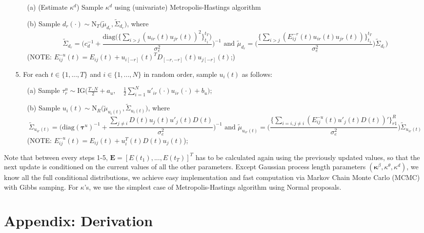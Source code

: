 \documentclass[a4paper]{article}
\begin{document}
\begin{itemize}
		\begin{enumerate}
			\item [(a)] (Estimate $\kappa^d$) Sample $\kappa^d$ using (univariate) Metropolis-Hastings algorithm 
				\item [(b)] Sample $d_r(\cdot) \sim \mbox{N}_T\big(\tilde{\mu}_{d_r}, \tilde{\Sigma}_{d_r} \big)$, where
$$\tilde{\Sigma}_{d_r} = \Big(c_d^{-1}+\frac{\mbox{diag}\big(\{\sum_{i>j}({u_{ir}(t)u_{jr}(t)})^2\}_{t_1}^{t_T}\big)}{\sigma_e^2}\Big)^{-1} \mbox{ and } \tilde{\mu}_{d_r} =  \Big(\frac{\{\sum_{i>j}(E^{-r}_{ij}(t)u_{ir}(t)u_{jr}(t))\}_{t_1}^{t_T}}{\sigma_e^2}\Big)\tilde{\Sigma}_{d_r})$$
(NOTE: $E^{-u}_{ij}(t)=E_{ij}(t)+u_{i[-r]}(t)^TD_{[-r, -r]}(t)u_{j[-r]}(t)$;)		
		\end{enumerate}		
		\item [5.] For each $t \in \{1,...,T\}$ and $i \in \{1,...,N\}$ in random order, sample $u_{i}(t)$ as follows:
		\begin{enumerate}
			\item [(a)] Sample $\tau_r^{u} \sim \mbox{IG}\big(\frac{T\cdot N}{2}+a_u,\quad \frac{1}{2}\sum\limits_{i = 1}^N u'_{ir}(\cdot)u_{ir}(\cdot)+b_u\big)$; 
			\item [(b)] Sample $u_{i}(t)\sim \mbox{N}_R\big(\tilde{\mu}_{u_{i}(t)}, \tilde{\Sigma}_{u_{i}(t)} \big)$, where
			$$\tilde{\Sigma}_{u_{ir}(t)} = \Big(\mbox{diag}(\boldsymbol{\tau}^u)^{-1}+\frac{\sum\limits_{j\neq i}D(t)u_{j}(t)u'_j(t)D(t)}{\sigma_e^2}\Big)^{-1}\mbox{ and } \tilde{\mu}_{u_{ir}(t)} = \Big(\frac{\{\sum_{i=i, j\neq i}(E^{-u}_{ij}(t)u'_{j}(t)D(t))'\}_{r1}^R}{{\sigma_e^2}}\Big)\tilde{\Sigma}_{u_{ir}(t)} $$ 
			(NOTE: $E^{-u}_{ij}(t)=E_{ij}(t)+u^T_{i}(t)D(t)u_{j}(t)$);
					\end{enumerate}			
	\end{itemize}
	Note that between every steps 1-5, $\boldsymbol{E}= [E(t_1),...,E(t_T)]^T$ has to be calculated again using the previously updated values, so that the next update is conditioned on the current values of all the other parameters. Except Gaussian process length parameters $(\boldsymbol{\kappa}^\beta, \kappa^\theta, \kappa^d)$, we know all the full conditional distributions, we achieve easy implementation and fast computation via Markov Chain Monte Carlo (MCMC) with Gibbs samping. For $\kappa$'s, we use the simplest case of Metropolis-Hastings algorithm using Normal proposals.
\section{Appendix: Derivation}
\end{document}

